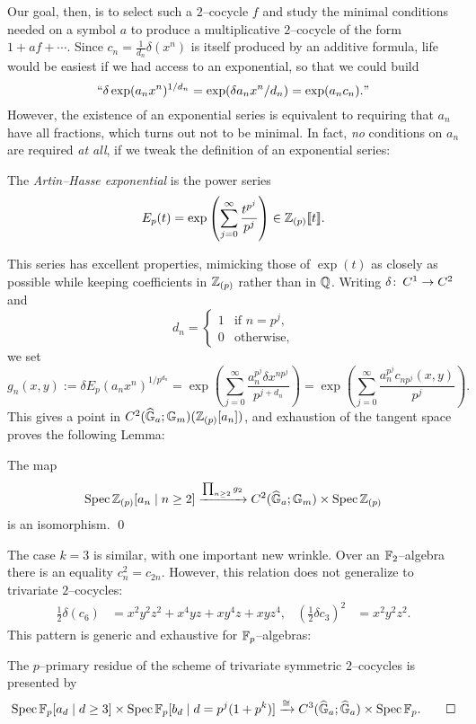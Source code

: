 Our goal, then, is to select such a $2$--cocycle $f$ and study the minimal conditions needed on a symbol $a$ to produce a multiplicative $2$--cocycle of the form $1 + af + \cdots$.  Since $c_n = \frac{1}{d_n} \delta(x^n)$ is itself produced by an additive formula, life would be easiest if we had access to an exponential, so that we could build \[\text{``$ \delta \exp(a_n x^n)^{1/d_n} = \exp(\delta a_n x^n / d_n) = \exp(a_n c_n). $''}\]  However, the existence of an exponential series is equivalent to requiring that $a_n$ have all fractions, which turns out not to be minimal.  In fact, \emph{no} conditions on $a_n$ are required \emph{at all}, if we tweak the definition of an exponential series:

\begin{definition}
The \textit{Artin--Hasse exponential} is the power series \[E_p(t) = \exp\left( \sum_{j=0}^\infty \frac{t^{p^j}}{p^j} \right) \in \mathbb Z_{(p)}\llbracket{t}\rrbracket.\]
\end{definition}

This series has excellent properties, mimicking those of $\exp(t)$ as closely as possible while keeping coefficients in $\mathbb Z_{(p)}$ rather than in $\mathbb{Q}$.  Writing $\delta\colon\thinspace C^1 \to C^2$ and \[d_n = \begin{cases} 1 & \text{if $n = p^j$}, \\ 0 & \text{otherwise}, \end{cases}\] we set \[g_n(x, y) := \delta E_p(a_n x^n)^{1/p^{d_n}} = \exp\left( \sum_{j=0}^\infty \frac{a_n^{p^j} \delta x^{np^j}}{p^{j + d_n}} \right) = \exp\left( \sum_{j=0}^\infty \frac{a_n^{p^j} c_{np^j}(x, y)}{p^j} \right).\]  This gives a point in $C^2(\widehat{\mathbb G}_a; \mathbb G_m)(\mathbb Z_{(p)}[a_n])$, and exhaustion of the tangent space proves the following Lemma:

\begin{lemma}
The map \[\operatorname{Spec} \mathbb Z_{(p)}[a_n \mid n \ge 2] \xrightarrow{\prod_{n \ge 2} g_2} C^2(\widehat{\mathbb G}_a; \mathbb G_m) \times \operatorname{Spec} \mathbb Z_{(p)}\] is an isomorphism. \qed
\end{lemma}

The case $k = 3$ is similar, with one important new wrinkle.  Over an $\mathbb F_2$--algebra there is an equality $c_n^2 = c_{2n}$.  However, this relation does not generalize to trivariate $2$--cocycles:
\begin{align*}
\frac{1}{2} \delta (c_6) & = x^2 y^2 z^2 + x^4 y z + x y^4 z + x y z^4, &
\left(\frac{1}{2} \delta c_3\right)^2 & = x^2 y^2 z^2.
\end{align*}
This pattern is generic and exhaustive for $\mathbb F_p$--algebras:
\begin{lemma}
The $p$--primary residue of the scheme of trivariate symmetric $2$--cocycles is presented by \[\operatorname{Spec} \mathbb F_p[a_d \mid d \ge 3] \times \operatorname{Spec} \mathbb F_p[b_d \mid d = p^j(1 + p^k)] \xrightarrow{\cong} C^3(\widehat{\mathbb G}_a; \widehat{\mathbb G}_a) \times \operatorname{Spec} \mathbb F_p. \qed\]
\end{lemma}

